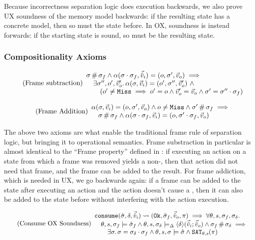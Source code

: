 Because incorrectness separation logic does execution backwards, we also prove UX soundness of the memory model backwards: if the resulting state has a concrete model, then so must the state before. In OX, soundness is instead forwards: if the starting state is sound, so must be the resulting state.

\subsubsection{Compositionality Axioms}

\begin{equation}
\tag{Frame subtraction}\label{eq:frame-sub}
\begin{array}{l}
\sigma\operatorname{\#}\sigma_f \land \alpha(\sigma\cdot\sigma_f,\vec{\hat{v}}_i)=(o, \sigma',\vec{v}_o) \implies \\
\quad\exists \sigma'', o', \vec{v}_o'\ldotp \alpha(\sigma,\vec{v}_i)=(o', \sigma'', \vec{v}_o') ~\land \\
\qquad(o' \neq \texttt{Miss} \implies o' = o \land  \vec{v}_o' = \vec{v}_o \land \sigma' = \sigma'' \cdot \sigma_f)
\end{array}
\end{equation}

\begin{equation}
\tag{Frame Addition}\label{eq:frame-add}
\begin{array}{l}
\alpha(\sigma,\vec{v}_i)=(o, \sigma', \vec{v}_o) \land o \neq \texttt{Miss} \land \sigma'\operatorname{\#}\sigma_f\implies\\
\quad\sigma \operatorname{\#} \sigma_f \land \alpha(\sigma\cdot\sigma_f, \vec{v}_i)=(o, \sigma'\cdot\sigma_f, \vec{v}_o)
\end{array}
\end{equation}

The above two axioms are what enable the traditional frame rule of separation logic, but bringing it to operational semantics. Frame substraction in particular is almost identical to the ``Frame property'' defined in \cite{localreasoning}: if executing an action on a state from which a frame was removed yields a non-\Miss, then that action did not need that frame, and the frame can be added to the result. For frame addiction, which is needed in UX, we go backwards again: if a frame can be added to the state after executing an action and the action doesn't cause a \Miss, then it can also be added to the state before without interfering with the action execution.

\begin{equation}
\tag{Consume OX Soundness}\label{eq:consume-ox-sound}
\begin{array}{l}
\texttt{consume}(\hat{\sigma},\delta,\vec{\hat{v}}_i)\rightsquigarrow (\texttt{Ok},\hat{\sigma}_f,\vec{\hat{v}}_o,\pi) \implies \forall \theta,s,\sigma_f,\sigma_\delta\ldotp \\
\quad \theta,s,\sigma_f\models \hat{\sigma}_f \land \theta, s, \sigma_\delta \models_{\Delta} \left<\delta\right>\!(\vec{\hat{v}}_i;\vec{\hat{v}}_o) \land \sigma_f\operatorname{\#}\sigma_\delta \implies \\
\qquad \exists \sigma\ldotp \sigma = \sigma_\delta \cdot \sigma_f \land \theta,s,\sigma\models \hat{\sigma} \land \texttt{SAT}_{\mathit{\theta,s}}(\pi)
\end{array}
\end{equation}

